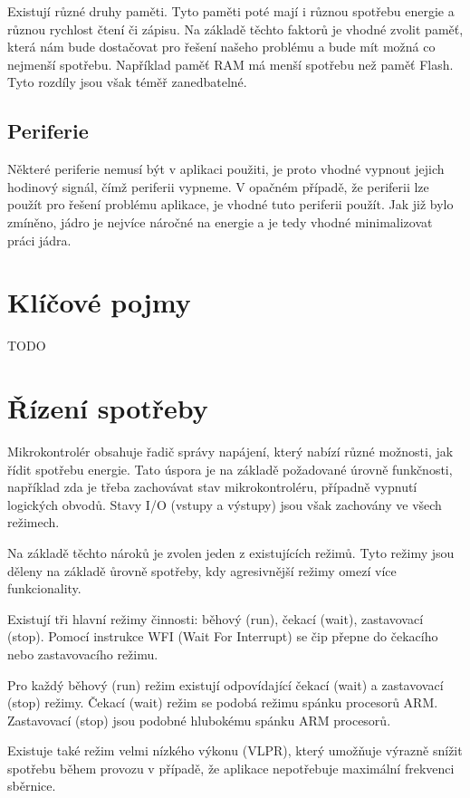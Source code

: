\documentclass{article}
\begin{document}
Existují různé druhy paměti. Tyto paměti poté mají i různou spotřebu energie a
různou rychlost čtení či zápisu. Na základě těchto faktorů je vhodné zvolit
paměť, která nám bude dostačovat pro řešení našeho problému a bude mít možná co
nejmenší spotřebu. Například paměť RAM má menší spotřebu než paměť Flash. Tyto
rozdíly jsou však téměř zanedbatelné.

\subsection{Periferie}

Některé periferie nemusí být v aplikaci použiti, je proto vhodné vypnout jejich
hodinový signál, čímž periferii vypneme. V opačném případě, že periferii lze
použít pro řešení problému aplikace, je vhodné tuto periferii použít. Jak již
bylo zmíněno, jádro je nejvíce náročné na energie a je tedy vhodné
minimalizovat práci jádra.

\section{Klíčové pojmy}

TODO

\section{Řízení spotřeby}

Mikrokontrolér obsahuje řadič správy napájení, který nabízí různé možnosti, jak
řídit spotřebu energie. Tato úspora je na základě požadované úrovně funkčnosti,
například zda je třeba zachovávat stav mikrokontroléru, případně vypnutí
logických obvodů. Stavy I/O (vstupy a výstupy) jsou však zachovány ve všech
režimech.

Na základě těchto nároků je zvolen jeden z existujících režimů. Tyto režimy
jsou děleny na základě ůrovně spotřeby, kdy agresivnější režimy omezí více
funkcionality.

Existují tři hlavní režimy činnosti: běhový (run), čekací (wait), zastavovací
(stop). Pomocí instrukce WFI (Wait For Interrupt) se čip přepne do čekacího
nebo zastavovacího režimu.

Pro každý běhový (run) režim existují odpovídající čekací (wait) a zastavovací
(stop) režimy. Čekací (wait) režim se podobá režimu spánku procesorů ARM.
Zastavovací (stop) jsou podobné hlubokému spánku ARM procesorů.

Existuje také režim velmi nízkého výkonu (VLPR), který umožňuje výrazně snížit
spotřebu během provozu v případě, že aplikace nepotřebuje maximální frekvenci
sběrnice.
\end{document}

